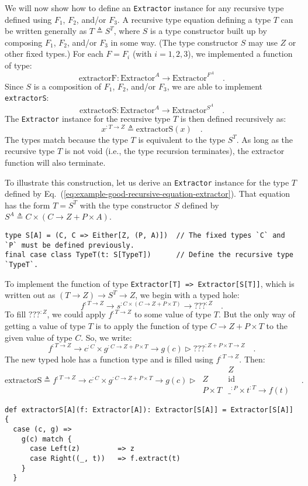 We will now show how to define an \lstinline!Extractor! instance
for any recursive type defined using $F_{1}$, $F_{2}$, and/or $F_{3}$.
A recursive type equation defining a type $T$ can be written generally
as $T\triangleq S^{T}$, where $S$ is a type constructor built up
by composing $F_{1}$, $F_{2}$, and/or $F_{3}$ in some way. (The
type constructor $S$ may use $Z$ or other fixed types.) For each
$F=F_{i}$ (with $i=1,2,3$), we implemented a function of type:
\[
\text{extractorF}:\text{Extractor}^{A}\rightarrow\text{Extractor}^{F^{A}}\quad.
\]
Since $S$ is a composition of $F_{1}$, $F_{2}$, and/or $F_{3}$,
we are able to implement \lstinline!extractorS!:
\[
\text{extractorS}:\text{Extractor}^{A}\rightarrow\text{Extractor}^{S^{A}}\quad.
\]
The \lstinline!Extractor! instance for the recursive type $T$ is
then defined recursively as:
\[
x^{:T\rightarrow Z}\triangleq\text{extractorS}\left(x\right)\quad.
\]
The types match because the type $T$ is equivalent to the type $S^{T}$.
As long as the recursive type $T$ is not void (i.e., the type recursion
terminates), the extractor function will also terminate.

To illustrate this construction, let us derive an \lstinline!Extractor!
instance for the type $T$ defined by Eq.~(\ref{eq:example-good-recursive-equation-extractor}).
That equation has the form $T=S^{T}$ with the type constructor $S$
defined by $S^{A}\triangleq C\times\left(C\rightarrow Z+P\times A\right)$.
\begin{lstlisting}
type S[A] = (C, C => Either[Z, (P, A)])  // The fixed types `C` and `P` must be defined previously.
final case class TypeT(t: S[TypeT])      // Define the recursive type `TypeT`. 
\end{lstlisting}
To implement the function of type \lstinline!Extractor[T] => Extractor[S[T]]!,
which is written out as $\left(T\rightarrow Z\right)\rightarrow S^{T}\rightarrow Z$,
we begin with a typed hole:
\[
f^{:T\rightarrow Z}\rightarrow s^{:C\times\left(C\rightarrow Z+P\times T\right)}\rightarrow\text{???}^{:Z}\quad.
\]
To fill $\text{???}^{:Z}$, we could apply $f^{:T\rightarrow Z}$
to some value of type $T$. But the only way of getting a value of
type $T$ is to apply the function of type $C\rightarrow Z+P\times T$
to the given value of type $C$. So, we write:
\[
f^{:T\rightarrow Z}\rightarrow c^{:C}\times g^{:C\rightarrow Z+P\times T}\rightarrow g(c)\triangleright\text{???}^{:Z+P\times T\rightarrow Z}\quad.
\]
The new typed hole has a function type and is filled using $f^{:T\rightarrow Z}$.
Then:
\[
\text{extractorS}\triangleq f^{:T\rightarrow Z}\rightarrow c^{:C}\times g^{:C\rightarrow Z+P\times T}\rightarrow g(c)\triangleright\,\begin{array}{|c||c|}
 & Z\\
\hline Z & \text{id}\\
P\times T & \_^{:P}\times t^{:T}\rightarrow f(t)
\end{array}\quad.
\]
\begin{lstlisting}
def extractorS[A](f: Extractor[A]): Extractor[S[A]] = Extractor[S[A]] {
  case (c, g) =>
    g(c) match {
      case Left(z)         => z
      case Right((_, t))   => f.extract(t)
    }
  }
\end{lstlisting}

